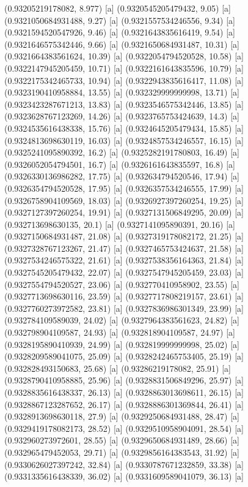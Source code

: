 {{{(0.93205219178082, 8.977) [a] 
(0.9320545205479432, 9.05) [a] 
(0.9321050684931488, 9.27) [a] 
(0.9321557534246556, 9.34) [a] 
(0.9321594520547926, 9.46) [a] 
(0.9321643835616419, 9.54) [a] 
(0.9321646575342446, 9.66) [a] 
(0.9321650684931487, 10.31) [a] 
(0.9321664383561624, 10.39) [a] 
(0.9322054794520528, 10.58) [a] 
(0.9322147945205459, 10.71) [a] 
(0.9322161643835596, 10.79) [a] 
(0.9322175342465733, 10.94) [a] 
(0.9322943835616417, 11.08) [a] 
(0.9323190410958884, 13.55) [a] 
(0.932329999999998, 13.71) [a] 
(0.9323423287671213, 13.83) [a] 
(0.9323546575342446, 13.85) [a] 
(0.9323628767123269, 14.26) [a] 
(0.9323765753424639, 14.3) [a] 
(0.9324535616438338, 15.76) [a] 
(0.9324645205479434, 15.85) [a] 
(0.9324813698630119, 16.03) [a] 
(0.9324857534246557, 16.15) [a] 
(0.9325241095890392, 16.2) [a] 
(0.9325282191780803, 16.49) [a] 
(0.9326052054794501, 16.7) [a] 
(0.9326161643835597, 16.8) [a] 
(0.9326330136986282, 17.75) [a] 
(0.932634794520546, 17.94) [a] 
(0.9326354794520528, 17.95) [a] 
(0.9326357534246555, 17.99) [a] 
(0.9326758904109569, 18.03) [a] 
(0.9326927397260254, 19.25) [a] 
(0.9327127397260254, 19.91) [a] 
(0.9327131506849295, 20.09) [a] 
(0.932713698630135, 20.1) [a] 
(0.9327141095890391, 20.16) [a] 
(0.9327150684931487, 21.08) [a] 
(0.9327319178082172, 21.25) [a] 
(0.9327328767123267, 21.47) [a] 
(0.9327465753424637, 21.58) [a] 
(0.9327534246575322, 21.61) [a] 
(0.9327538356164363, 21.84) [a] 
(0.9327545205479432, 22.07) [a] 
(0.9327547945205459, 23.03) [a] 
(0.9327554794520527, 23.06) [a] 
(0.932770410958902, 23.55) [a] 
(0.9327713698630116, 23.59) [a] 
(0.9327717808219157, 23.61) [a] 
(0.9327760273972582, 23.81) [a] 
(0.9327836986301349, 23.99) [a] 
(0.932784109589039, 24.02) [a] 
(0.9327964383561623, 24.82) [a] 
(0.932798904109587, 24.93) [a] 
(0.932818904109587, 24.97) [a] 
(0.9328195890410939, 24.99) [a] 
(0.932819999999998, 25.02) [a] 
(0.9328209589041075, 25.09) [a] 
(0.9328242465753405, 25.19) [a] 
(0.932828493150683, 25.68) [a] 
(0.93286219178082, 25.91) [a] 
(0.9328790410958885, 25.96) [a] 
(0.9328831506849296, 25.97) [a] 
(0.9328835616438337, 26.13) [a] 
(0.9328863013698611, 26.15) [a] 
(0.9328867123287652, 26.17) [a] 
(0.9328886301369844, 26.41) [a] 
(0.9328913698630118, 27.9) [a] 
(0.9329250684931488, 28.47) [a] 
(0.9329419178082173, 28.52) [a] 
(0.9329510958904091, 28.54) [a] 
(0.932960273972601, 28.55) [a] 
(0.9329650684931489, 28.66) [a] 
(0.932965479452053, 29.71) [a] 
(0.9329856164383543, 31.92) [a] 
(0.9330626027397242, 32.84) [a] 
(0.9330787671232859, 33.38) [a] 
(0.9331335616438339, 36.02) [a] 
(0.9331609589041079, 36.13) [a] 
}}}
